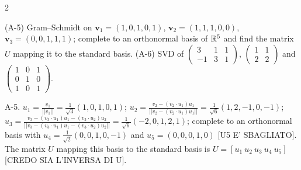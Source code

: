 \begin{paracol}{2}
\begin{exercise}[PS1 (2013), A-5 and A-6]
(A-5) Gram--Schmidt on $\bm v_1=(1,0,1,0,1)$, $\bm v_2=(1,1,1,0,0)$, $\bm v_3=(0,0,1,1,1)$; complete to an orthonormal basis of
$\mathbb{R}^5$ and find the matrix $U$ mapping it to the standard basis.
(A-6) SVD of $\left(\begin{smallmatrix}3&1&1\\-1&3&1\end{smallmatrix}\right)$, $\left(\begin{smallmatrix}1&1\\2&2\end{smallmatrix}\right)$ and
$\left(\begin{smallmatrix}1&0&1\\0&1&0\\1&0&1\end{smallmatrix}\right)$.
\end{exercise}
\begin{mysolution}
  
  A-5. $u_1 = \frac{v_1}{||v_1||} = \frac{1}{\sqrt{3}}(1,0,1,0,1)$; $u_2 = \frac{v_2 - (v_2 \cdot u_1)u_1}{||v_2 - (v_2 \cdot u_1)u_1||} = \frac{1}{\sqrt{6}}(1, 2, -1, 0, -1)$; $u_3 = \frac{v_3 - (v_3 \cdot u_1)u_1 - (v_3 \cdot u_2)u_2}{||v_3 - (v_3 \cdot u_1)u_1 - (v_3 \cdot u_2)u_2||} = \frac{1}{\sqrt{6}}(-2, 0, 1, 2, 1)$; complete to an orthonormal basis with $u_4 = \frac{1}{\sqrt{2}}(0, 0, 1, 0, -1)$ and $u_5 = (0, 0, 0, 1, 0)$ [U5 E' SBAGLIATO]. The matrix $U$ mapping this basis to the standard basis is $U = [u_1\ u_2\ u_3\ u_4\ u_5]$ [CREDO SIA L'INVERSA DI U].
\end{mysolution}


\end{paracol}
